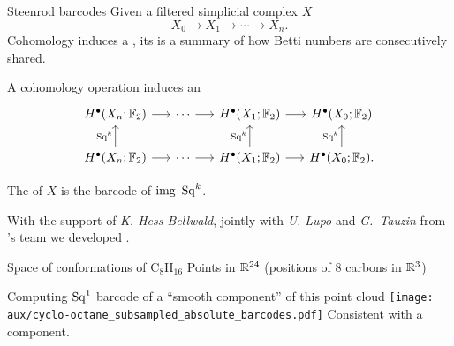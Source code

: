 \begin{frame}[fragile]{Steenrod barcodes}
	Given a filtered simplicial complex $X$
	\[
	X_0 \to X_1 \to \cdots \to X_n.
	\]
	Cohomology induces a , its  is a summary of how Betti numbers are consecutively shared.

	\smallskip
	A cohomology operation induces an 
	\[
	\begin{tikzcd}[column sep = 15]
	H^\bullet(X_n; \Ftwo) \arrow[r] & \cdots \arrow[r] & H^\bullet(X_1; \Ftwo) \arrow[r] & H^\bullet(X_0; \Ftwo) \\
	H^\bullet(X_n; \Ftwo) \arrow[u, "\Sq^k"] \arrow[r] & \cdots \arrow[r] & H^\bullet(X_1; \Ftwo) \arrow[u, "\Sq^k"] \arrow[r] & H^\bullet(X_0; \Ftwo) \arrow[u, "\Sq^k"].
	\end{tikzcd}
	\]

	\pause
	The  of $X$ is the barcode of $\mathrm{img}\ \Sq^k$.

	\bigskip\pause
	With the support of \textit{K. Hess-Bellwald}, jointly with \textit{U. Lupo} and \textit{G.~Tauzin} from 's team \medskip
	we developed .
\end{frame}

%

\begin{frame}{Space of conformations of $\mathrm{C_8H_{16}}$}
	\pause
	Points in $\mathbb{R}^{24}$ (positions of $8$ carbons in $\mathbb{R}^3$)

	\pause\smallskip
	Computing $\operatorname{Sq}^1$ barcode of a ``smooth component'' of this point cloud
	\smallskip
	\texttt{[image: aux/cyclo-octane\_subsampled\_absolute\_barcodes.pdf]}
	Consistent with a  component.
\end{frame}

